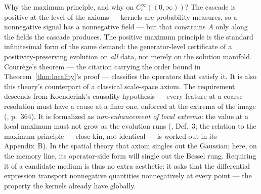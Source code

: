 Why the maximum principle, and why on $C_c^\infty((0,\infty))$? The cascade is positive at
the level of the axioms --- kernels are probability measures, so a nonnegative signal has a
nonnegative field --- but that constrains $A$ only along the fields the cascade produces.
The positive maximum principle is the standard infinitesimal form of the same demand: the
generator-level certificate of a positivity-preserving evolution on \emph{all} data, not
merely on the solution manifold. Courr\`ege's theorem --- the citation carrying the
order bound in Theorem~\ref{thm:locality}'s proof --- classifies the operators that satisfy
it. It is also this theory's counterpart of a classical scale-space axiom. The requirement
descends from Koenderink's causality hypothesis --- every feature at a coarse resolution
must have a cause at a finer one, enforced at the extrema of the image
(, p.~364). It is formalized as \emph{non-enhancement
of local extrema}: the value at a local maximum must not grow as the evolution runs
(, Def.~3; the relation to the maximum principle ---
close kin, not identical --- is worked out in its Appendix~B). In the spatial
theory that axiom singles out the Gaussian; here, on the memory line, its operator-side
form will single out the Bessel rung. Requiring it of a candidate medium is thus no extra
aesthetic: it asks that the differential expression transport nonnegative quantities
nonnegatively at every point --- the property the kernels already have globally.

